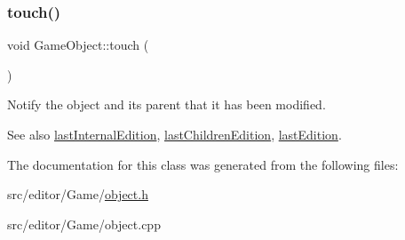 \subsubsection{\texorpdfstring{touch()}{touch()}}
{\footnotesize\ttfamily void Game\+Object\+::touch (\begin{DoxyParamCaption}{ }\end{DoxyParamCaption})}

Notify the object and its parent that it has been modified.

\begin{DoxySeeAlso}{See also}
\hyperlink{class_game_object_a76035507be4203cc72186f210a9c4fee}{last\+Internal\+Edition}, \hyperlink{class_game_object_a83b0ea6d2c30edf0b70d3a9e2e80563b}{last\+Children\+Edition}, \hyperlink{class_game_object_a060fb833acf28832fa85a7927227bdde}{last\+Edition}. 
\end{DoxySeeAlso}


The documentation for this class was generated from the following files\+:\begin{DoxyCompactItemize}
\item 
src/editor/\+Game/\hyperlink{object_8h}{object.\+h}\item 
src/editor/\+Game/object.\+cpp\end{DoxyCompactItemize}
